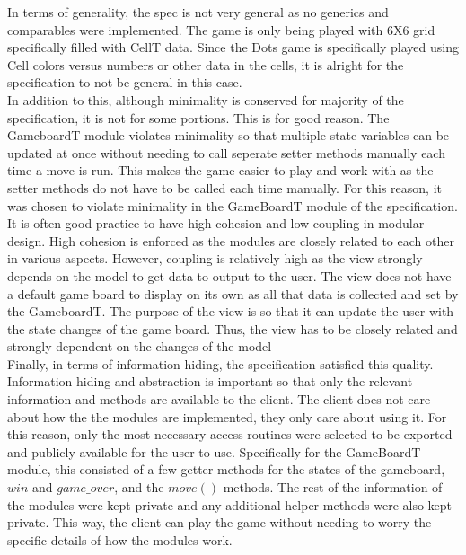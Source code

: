 \documentclass[12pt]{article}
\begin{document}
In terms of generality, the spec is not very general as no generics and comparables were implemented. The game is only being played with 6X6 grid specifically filled with CellT data. Since the Dots game is specifically played using Cell colors versus numbers or other data in the cells, it is alright for the specification to not be general in this case.\\

In addition to this, although minimality is conserved for majority of the specification, it is not for some portions. This is for good reason. The GameboardT module violates minimality so that multiple state variables can be updated at once without needing to call seperate setter methods manually each time a move is run. This makes the game easier to play and work with as the setter methods do not have to be called each time manually. For this reason, it was chosen to violate minimality in the GameBoardT module of the specification.\\

 It is often good practice to have high cohesion and low coupling in modular design. High cohesion is enforced as the modules are closely related to each other in various aspects. However, coupling is relatively high as the view strongly depends on the model to get data to output to the user. The view does not have a default game board to display on its own as all that data is collected and set by the GameboardT. The purpose of the view is so that it can update the user with the state changes of the game board. Thus, the view has to be closely related and strongly dependent on the changes of the model\\
 
Finally, in terms of information hiding, the specification satisfied this quality. Information hiding and abstraction is important so that only the relevant information and methods are available to the client. The client does not care about how the the modules are implemented, they only care about using it. For this reason, only the most necessary access routines were selected to be exported and publicly available for the user to use. Specifically for the GameBoardT module, this consisted of a few getter methods for the states of the gameboard, $win$ and $game\_over$, and the $move()$ methods. The rest of the information of the modules were kept private and any additional helper methods were also kept private. This way, the client can play the game without needing to worry the specific details of how the modules work.\\
 
\end{document}
